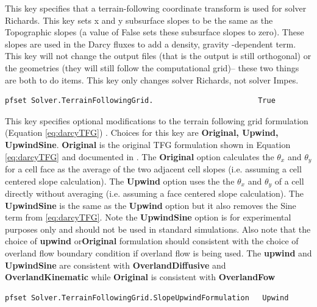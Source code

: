{
This key specifies that a terrain-following coordinate transform is used for solver Richards. This key sets x and y subsurface slopes to be the same as the Topographic slopes (a value of False sets these subsurface slopes to zero).
These slopes are used in the Darcy fluxes to add a density, gravity -dependent term.  This key will not change the output files (that is the output is still orthogonal) or the geometries (they will still follow the computational grid)-- these two things are both to do items.  This key only changes solver Richards, not solver Impes.
}

\begin{display}\begin{verbatim}
pfset Solver.TerrainFollowingGrid.                        True
\end{verbatim}\end{display}

{
This key specifies optional modifications to the terrain following grid formulation (Equation \ref{eq:darcyTFG}) .  Choices for this key are {\bf Original, Upwind, UpwindSine}.
{\bf Original} is the original TFG formulation shown in Equation \ref{eq:darcyTFG} and documented in \cite{M13}.  The {\bf Original} option calculates the $\theta_x$ and $\theta_y$ for a cell face as the average of the two adjacent cell slopes (i.e. assuming a cell centered slope calculation). The {\bf Upwind} option uses the the $\theta_x$ and $\theta_y$ of a cell directly without averaging (i.e. assuming a face centered slope calculation). The {\bf UpwindSine} is the same as the {\bf Upwind} option but it also removes the Sine term from \ref{eq:darcyTFG}. Note the {\bf UpwindSine} option is for experimental purposes only and should not be used in standard simulations.  Also note that the choice of {\bf upwind} or{\bf Original} formulation should consistent with the choice of overland flow boundary condition if overland flow is being used.  The {\bf upwind} and {\bf UpwindSine} are consistent with {\bf OverlandDiffusive} and {\bf OverlandKinematic} while {\bf Original} is consistent with {\bf OverlandFow}
}

\begin{display}\begin{verbatim}
pfset Solver.TerrainFollowingGrid.SlopeUpwindFormulation   Upwind
\end{verbatim}\end{display}

